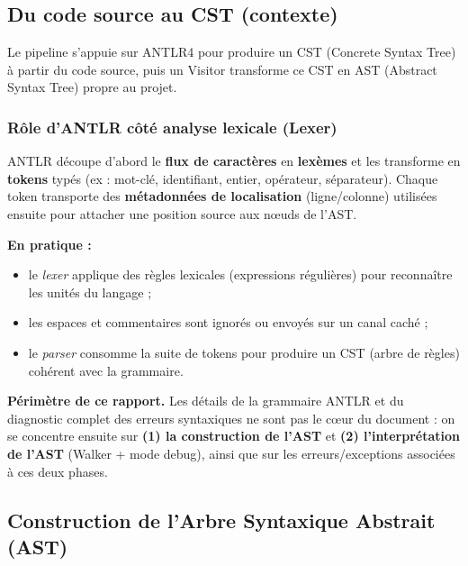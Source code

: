 \subsection{Du code source au CST (contexte)}

Le pipeline s'appuie sur ANTLR4 pour produire un CST (Concrete Syntax Tree) à partir du code source, puis un Visitor transforme ce CST en AST (Abstract Syntax Tree) propre au projet.

\subsubsection{Rôle d'ANTLR côté analyse lexicale (Lexer)}

ANTLR découpe d'abord le \textbf{flux de caractères} en \textbf{lexèmes} et les transforme en \textbf{tokens} typés (ex : mot-clé, identifiant, entier, opérateur, séparateur). Chaque token transporte des \textbf{métadonnées de localisation} (ligne/colonne) utilisées ensuite pour attacher une position source aux nœuds de l'AST.

\medskip
\noindent\textbf{En pratique :}
\begin{itemize}
    \item le \emph{lexer} applique des règles lexicales (expressions régulières) pour reconnaître les unités du langage ;
    \item les espaces et commentaires sont ignorés ou envoyés sur un canal caché ;
    \item le \emph{parser} consomme la suite de tokens pour produire un CST (arbre de règles) cohérent avec la grammaire.
\end{itemize}

\medskip
\noindent\textbf{Périmètre de ce rapport.} Les détails de la grammaire ANTLR et du diagnostic complet des erreurs syntaxiques ne sont pas le cœur du document : on se concentre ensuite sur \textbf{(1) la construction de l'AST} et \textbf{(2) l'interprétation de l'AST} (Walker + mode debug), ainsi que sur les erreurs/exceptions associées à ces deux phases.

\subsection{Construction de l'Arbre Syntaxique Abstrait (AST)}

